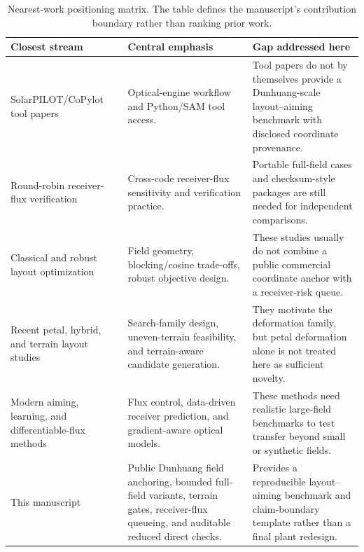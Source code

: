 \documentclass[final,3p,times]{elsarticle}
\begin{document}
\begin{table}[t]
\centering
\caption{Nearest-work positioning matrix. The table defines the manuscript's contribution boundary rather than ranking prior work.}
\label{tab:nearest-work-positioning}
\small
\begin{tabular}{p{}p{}p{}}
\toprule
Closest stream & Central emphasis & Gap addressed here \\
\midrule
SolarPILOT/CoPylot tool papers \cite{wagner2018solarpilot,hamilton2022copilot} & Optical-engine workflow and Python/SAM tool access. & Tool papers do not by themselves provide a Dunhuang-scale layout--aiming benchmark with disclosed coordinate provenance. \\
Round-robin receiver-flux verification \cite{mitchell2025roundrobin} & Cross-code receiver-flux sensitivity and verification practice. & Portable full-field cases and checksum-style packages are still needed for independent comparisons. \\
Classical and robust layout optimization \cite{collado2009surrounding,noone2019quick,li2022robust} & Field geometry, blocking/cosine trade-offs, robust objective design. & These studies usually do not combine a public commercial coordinate anchor with a receiver-risk queue. \\
Recent petal, hybrid, and terrain layout studies \cite{tang2025petal,ghazanfari2025hefaal,yu2026slopedterrain} & Search-family design, uneven-terrain feasibility, and terrain-aware candidate generation. & They motivate the deformation family, but petal deformation alone is not treated here as sufficient novelty. \\
Modern aiming, learning, and differentiable-flux methods \cite{sanchez2024experimental,schiricke2025fluxprediction,lin2025dmcrt,zheng2025diffneg} & Flux control, data-driven receiver prediction, and gradient-aware optical models. & These methods need realistic large-field benchmarks to test transfer beyond small or synthetic fields. \\
This manuscript & Public Dunhuang field anchoring, bounded full-field variants, terrain gates, receiver-flux queueing, and auditable reduced direct checks. & Provides a reproducible layout--aiming benchmark and claim-boundary template rather than a final plant redesign. \\
\bottomrule
\end{tabular}
\end{table}
\end{document}
